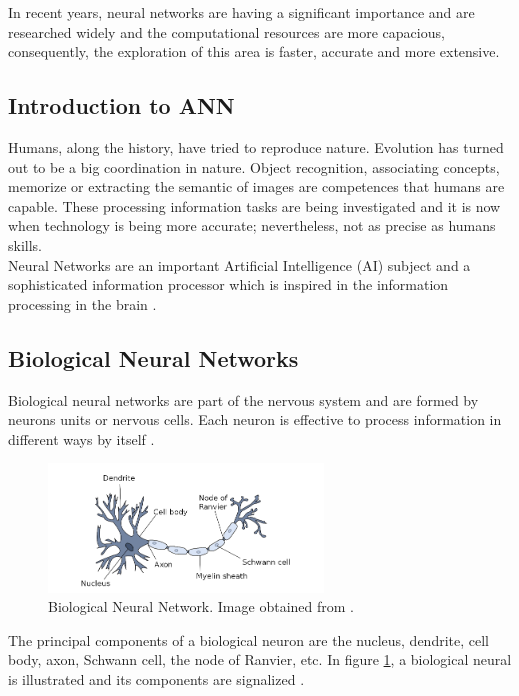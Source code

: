 In recent years, neural networks are having a significant importance and are researched widely and the computational resources are more capacious, consequently, the exploration of this area is faster, accurate and more extensive.\\

\subsection{Introduction to ANN}
Humans, along the history, have tried to reproduce nature. Evolution has turned out to be a big coordination in nature. Object recognition, associating concepts, memorize or extracting the semantic of images are competences that humans are capable. These processing information tasks are being investigated and it is now when technology is being more accurate; nevertheless, not as precise as humans skills.\\

Neural Networks are an important Artificial Intelligence (AI) subject and a sophisticated information processor which is inspired in the information processing in the brain \cite{Rojas}.\\

\subsection{Biological Neural Networks}
Biological neural networks are part of the nervous system and are formed by neurons units or nervous cells. Each neuron is effective to process information in different ways by itself \cite{Rojas}.\\

\begin{figure}[htb]
\centering
\includegraphics[width=0.65\textwidth]{images_miscelaneus/neuron.png}
\caption{Biological Neural Network. Image obtained from \cite{BINN}.} \label{fig:Bio-Neuron}
\end{figure}

The principal components of a biological neuron are the nucleus, dendrite, cell body, axon, Schwann cell, the node of Ranvier, etc. In figure \ref{fig:Bio-Neuron}, a biological neural is illustrated and its components are signalized \cite{BINN}.\\

